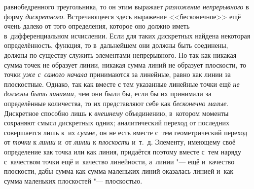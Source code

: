 равнобедренного треугольника, то он этим выражает {\em разложение непрерывного}
в форму {\em дискретного}. Встречающееся здесь выражение <<бесконечное>> ещё
очень далеко от того определения, которое оно должно иметь в~дифференциальном
исчислении. Если для таких дискретных найдена некоторая определённость,
функция, то в~дальнейшем они должны быть соединены, должны по существу служить
элементами непрерывного. Но так как никакая сумма точек не образует линии,
никакая сумма линий не образует плоскости, то точки {\em уже с~самого начала}
принимаются за линейные, равно как линии за плоскостные. Однако, так как вместе
с тем указанные линейные точки ещё {\em не должны быть линиями,} чем они были
бы, если бы их принимали за определённые количества, то их представляют себе
как {\em бесконечно малые}. Дискретное способно лишь к {\em внешнему}
объединению, в~котором моменты сохраняют смысл дискретных одних; аналитический
переход от последних совершается лишь к~их {\em сумме,} он не есть вместе с~тем
геометрический переход от {\em точки} к {\em линии} и~от {\em линии} к
{\em плоскости} и~т.~д. Элементу, имеющему своё определение как точка или как
линия, придаётся поэтому вместе с~тем наряду с~качеством точки ещё и~качество
линейности, а~линии "--- ещё и~качество плоскости, дабы сумма как сумма
маленьких линий оказалась линией и~как сумма маленьких плоскостей "---
плоскостью.

